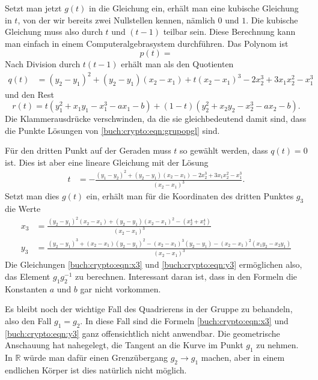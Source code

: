 Setzt man jetzt $g(t)$ in die Gleichung ein, erhält man eine kubische
Gleichung in $t$, von der wir bereits zwei Nullstellen kennen, nämlich 
$0$ und $1$.
Die kubische Gleichung muss also durch $t$ und $(t-1)$ teilbar sein.
Diese Berechnung kann man einfach in einem Computeralgebrasystem
durchführen.
Das Polynom ist
\[
p(t)
=
\]
Nach Division durch $t(t-1)$ erhält man als den Quotienten
\begin{align*}
q(t)
&=
(y_2-y_1)^2 
+
(y_2-y_1) (x_2-x_1)
+
t(x_2-x_1)^3
-
2x_2^3+3x_1x_2^2-x_1^3
\end{align*}
und den Rest
\[
r(t)
=
t(y_1^2+x_1y_1-x_1^3-ax_1-b)
+
(1-t)(y_2^2+x_2y_2-x_2^3-ax_2-b).
\]
Die Klammerausdrücke verschwinden, da die sie gleichbedeutend damit sind,
dass die Punkte Lösungen von \eqref{buch:crypto:eqn:grupopgl} sind.

Für den dritten Punkt auf der Geraden muss $t$ so gewählt werden, dass
$q(t)=0$ ist.
Dies ist aber eine lineare Gleichung mit der Lösung
\begin{align*}
t
&=
-\frac{
(y_1-y_2)^2
+
(y_2-y_1)(x_2-x_1)
-2x_2^3+3x_1x_2^2-x_1^3
}{(x_2-x_1)^3}
.
\end{align*}
Setzt man dies $g(t)$ ein, erhält man für die Koordinaten des dritten
Punktes $g_3$ die Werte
\begin{align}
x_3
&=
\frac{
(y_2-y_1)^2(x_2-x_1) + (y_2-y_1)(x_2-x_1)^2
-(x_2^4+x_1^4)
}{
(x_2-x_1)^3
}
\label{buch:crypto:eqn:x3}
\\
y_3
&=
\frac{
(y_2-y_1)^3
+(x_2-x_1)(y_2-y_1)^2
-(x_{2}-x_{1})^3 ( y_{2} - y_{1})
-(x_{2}-x_{1})^2 ( x_{1} y_{2}- x_{2} y_{1})
}{
(x_2-x_1)^3
}
\label{buch:crypto:eqn:y3}
\end{align}
Die Gleichungen 
\eqref{buch:crypto:eqn:x3}
und
\eqref{buch:crypto:eqn:y3}
ermöglichen also, das Element $g_1g_2^{-1}$ zu berechnen.
Interessant daran ist, dass in den Formeln die Konstanten $a$ und $b$ 
gar nicht vorkommen.

Es bleibt noch der wichtige Fall des Quadrierens in der Gruppe zu
behandeln, also den Fall $g_1=g_2$.
In diese Fall sind die Formeln
\eqref{buch:crypto:eqn:x3}
und
\eqref{buch:crypto:eqn:y3}
ganz offensichtlich nicht anwendbar.
Die geometrische Anschauung hat nahegelegt, die Tangent an die Kurve
im Punkt $g_1$ zu nehmen.
In $\mathbb{R}$ würde man dafür einen Grenzübergang $g_2\to g_1$ machen,
aber in einem endlichen Körper ist dies natürlich nicht möglich.

